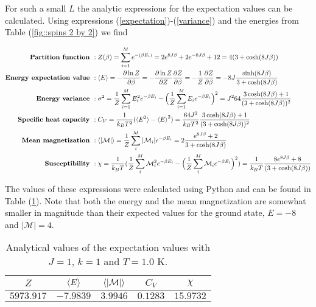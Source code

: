 \documentclass[11pt]{article}
\begin{document}
\begin{flushleft}
For such a small $L$ the analytic expressions for the expectation values can be calculated. Using expressions (\ref{expectation})-(\ref{variance}) and the energies from Table (\ref{fig::spins 2 by 2}) we find



\begin{align*}
\textbf{Partition function } &:
Z(\beta) = \sum_{i=1}^M e^{-(\beta E_i)}
= 2 e^{8J \beta} + 2 e^{-8J \beta} + 12
= 4(3 + \cosh (8 J \beta))\\
\textbf{Energy expectation value } &:
\braket{E} = - \frac{\partial \ln Z}{\partial \beta}= - \frac{\partial \ln Z}{\partial Z} \frac{\partial Z}{\partial \beta} = - \frac{1}{Z} \frac{\partial Z}{\partial \beta}
= - 8J \frac{\sinh(8J \beta)}{3 + \cosh(8J \beta)}  \\
\textbf{Energy variance } &:
\sigma^2 = \frac{1}{Z} \sum_{i=1}^M E_i^2 e^{- \beta E_i} - \Big(
\frac{1}{Z} \sum_{i=1}^M E_i e^{- \beta E_i} 
\Big)^2 = J^264 \frac{
3\cosh (8J \beta) + 1}{ (3 + \cosh (8 J \beta))^2}\\
\textbf{Specific heat capacity } &:
C_V = \frac{1}{k_B T^2} (\braket{E^2} - \braket{E}^2) = \frac{64J^2}{k_B T^2}
\frac{3\cosh (8J \beta) + 1}{ (3 + \cosh (8 J \beta))^2}\\
\textbf{Mean magnetization } &:
\braket{|\mathcal{M}|} 
= \frac{1}{Z} \sum_i^M |\mathcal{M}_i| e^{- \beta E_i} =2 \frac{e^{8J \beta} + 2 }{3 + \cosh (8 J \beta)} \\
\textbf{Susceptibility } &:
\chi = \frac{1}{k_B T} (\frac{1}{Z} \sum_i^M \mathcal{M}_i^2 e^{- \beta E_i}- \Big(\frac{1}{Z} \sum_i^M \mathcal{M}_i e^{- \beta E_i}\Big)^2)
= \frac{1}{k_B T} 
\frac{8e^{8J \beta} +8}{(3 + \cosh (8 J \beta))} \\
\end{align*}

\end{flushleft}

\begin{flushleft}

The values of these expressions were calculated using Python and can be found in Table (\ref{Fig::analytical}). Note that both the energy and the mean magnetization are somewhat smaller in magnitude than their expected values for the ground state, $E=-8$ and $|\mathcal{M}| = 4$.

\begin{table}[H]
\centering
\begin{tabular}{|c|c|c|c|c|}
\hline
$Z$ &$\braket{E}$ & $\braket{|\mathcal{M}|}$ & $C_V$ & $\chi$\\
\hline
$5973.917$ & $-7.9839$ & $3.9946$ & $0.1283$ & $15.9732$\\
\hline
\end{tabular}
\caption{Analytical values of the expectation values with  $J=1$, $k=1$ and $T=1.0$ K.}
\label{Fig::analytical}
\end{table}
\end{flushleft}
\end{document}
